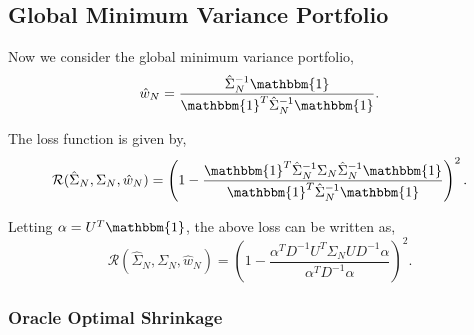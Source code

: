 \documentclass{article}
\begin{document}
\subsection{Global Minimum Variance Portfolio}

Now we consider the global minimum variance portfolio,
$$
	\hat{w}_N = \frac{\hat{\Sigma}_N^{-1}\mathbbm{1}}
						{\mathbbm{1}^T\hat{\Sigma}_N^{-1}\mathbbm{1}}.
$$

The loss function is given by,
$$
	\mathcal{R}(\hat{\Sigma}_N, \Sigma_N, \hat{w}_N)
		= \left(
				1 - 
					\frac{\mathbbm{1}^T \hat{\Sigma}_N^{-1} \Sigma_N \hat{\Sigma}_N^{-1} \mathbbm{1}}
						   {\mathbbm{1}^T \hat{\Sigma}_N^{-1} \mathbbm{1}}
			\right)^2.
$$

Letting $\alpha = U^T \mathbbm{1}$, the above loss can be written as,
$$
	\mathcal{R}(\hat{\Sigma}_N, \Sigma_N, \hat{w}_N)
		= \left(
				1 - \frac{\alpha^T D^{-1} U^T\Sigma_N U D^{-1} \alpha}
						   {\alpha^T D^{-1} \alpha}
			\right)^2.
$$

\subsubsection{Oracle Optimal Shrinkage}
\end{document}
